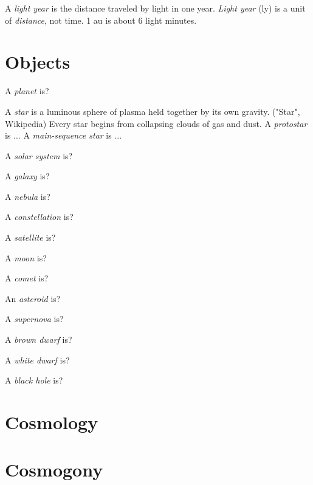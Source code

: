 A \emph{light year} is the distance traveled by light in one year.
\emph{Light year} (ly) is a unit of \emph{distance}, not time.
1 au is about 6 light minutes.

\section{Objects}

A \emph{planet} is?

A \emph{star} is a luminous sphere of plasma held together by its own gravity.
("Star", Wikipedia)
Every star begins from collapsing clouds of gas and dust.
A \emph{protostar} is ...
A \emph{main-sequence star} is ...

A \emph{solar system} is?

A \emph{galaxy} is?

A \emph{nebula} is?

A \emph{constellation} is?

A \emph{satellite} is?

A \emph{moon} is?

A \emph{comet} is?

An \emph{asteroid} is?

A \emph{supernova} is?

A \emph{brown dwarf} is?

A \emph{white dwarf} is?

A \emph{black hole} is?

\section{Cosmology}

\section{Cosmogony}
